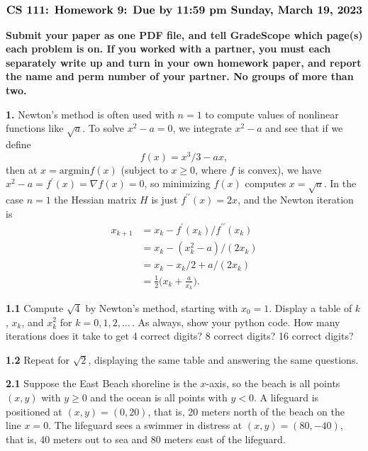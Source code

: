 \documentclass[11pt]{article}
\begin{document}
$$\mbox{\Large \bf CS 111: Homework 9: Due by 11:59 pm Sunday, March 19, 2023}$$
\par\smallskip\noindent
{\bf Submit your paper as one PDF file,
and tell GradeScope which page(s) each problem is on.
If you worked with a partner, 
you must each separately write up and turn in your own homework paper, 
and report the name and perm number of your partner.
No groups of more than two.
}

\par\bigskip\noindent
{\bf 1.}
Newton's method is often used with $n=1$ to compute 
values of nonlinear functions like $\sqrt a$. 
To solve $x^2-a=0$, we integrate $x^2-a$ and see that if we define
$$f(x) = x^3/3-ax,$$ 
then at $x=\mbox{argmin} f(x)$ (subject to $x\ge 0$, where $f$ is convex), 
we have $x^2-a = f^\prime(x) = \nabla f(x) = 0$,
so minimizing $f(x)$ computes $x=\sqrt a$.
In the case $n=1$ the Hessian matrix $H$ is just $f^{\prime\prime}(x) = 2x$,
and the Newton iteration is
\begin{align}
x_{k+1} &= x_k - f^\prime(x_k)/f^{\prime\prime}(x_k) \\
        &= x_k - (x_k^2-a)/(2x_k) \\
        &= x_k - x_k/2 +a/(2x_k) \\
        &= \frac{1}{2}\Big(x_k + \frac{a}{x_k}\Big).
\end{align}

\par\medskip\noindent
{\bf 1.1} 
Compute $\sqrt 4$ by Newton's method, starting with $x_0=1$.
Display a table of $k$, $x_k$, and $x_k^2$ for $k=0,1,2,\ldots$\,.
As always, show your python code.
How many iterations does it take to get 4 correct digits?
8 correct digits? 16 correct digits?

\par\medskip\noindent
{\bf 1.2} 
Repeat for $\sqrt 2$, 
displaying the same table and answering the same questions.

\par\bigskip\noindent
{\bf 2.1}
Suppose the East Beach shoreline is the $x$-axis, 
so the beach is all points $(x,y)$ with $y\ge 0$ and 
the ocean is all points with $y<0$.
A lifeguard is positioned at $(x,y) = (0,20)$, that is, 
20 meters north of the beach on the line $x=0$.
The lifeguard sees a swimmer in distress at $(x,y)=(80,-40)$,
that is, 40 meters out to sea and 80 meters east of the lifeguard.
\end{document}
